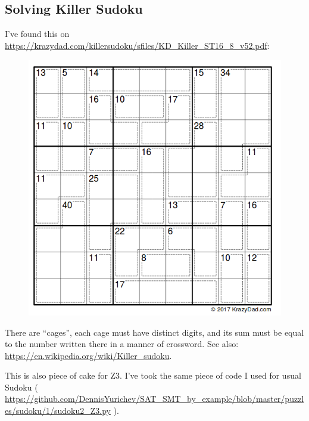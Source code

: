 \subsection{Solving Killer Sudoku}

I've found this on \url{https://krazydad.com/killersudoku/sfiles/KD_Killer_ST16_8_v52.pdf}:

\begin{figure}[H]
\centering
\includegraphics[scale=0.6]{puzzles/sudoku/killer/puzzle.png}
\caption{}
\end{figure}

There are ``cages'', each cage must have distinct digits,
and its sum must be equal to the number written there in a manner of crossword.
See also: \url{https://en.wikipedia.org/wiki/Killer_sudoku}.

This is also piece of cake for Z3.
I've took the same piece of code I used for usual Sudoku ( \url{https://github.com/DennisYurichev/SAT_SMT_by_example/blob/master/puzzles/sudoku/1/sudoku2_Z3.py} ).

